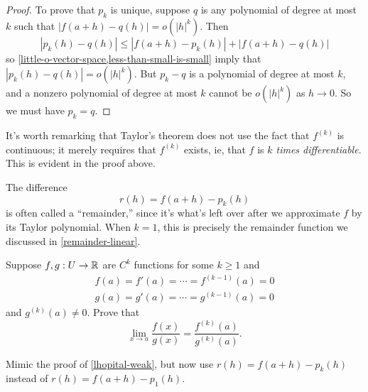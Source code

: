 \begin{proof}
	To prove that $p_k$ is unique, suppose $q$ is any polynomial of degree at most $k$ such that $|f(a+h) -q(h)| = o(|h|^k)$. Then 
	\[ |p_k(h) - q(h)| \leq |f(a+h) - p_k(h)| + |f(a+h) - q(h)| \] 
	so \cref{little-o-vector-space,less-than-small-is-small} imply that $|p_k(h) -  q(h)| = o(|h|^k)$. But $p_k - q$ is a polynomial of degree at most $k$, and a nonzero polynomial of degree at most $k$ cannot be $o(|h|^k)$ as $h \to 0$. So we must have $p_k = q$.
\end{proof}

\begin{unimportantremark}
	It's worth remarking that Taylor's theorem does not use the fact that $f^{(k)}$ is continuous; it merely requires that $f^{(k)}$ exists, ie, that $f$ is \emph{$k$ times differentiable}. This is evident in the proof above. 
\end{unimportantremark}

The difference 
\[ r(h) = f(a+h) - p_k(h) \]
is often called a ``remainder,'' since it's what's left over after we approximate $f$ by its Taylor polynomial. When $k = 1$, this is precisely the remainder function we discussed in \cref{remainder-linear}.

\begin{exercise} \label{lhopital-less-weak}
	Suppose $f, g : U \to \mathbb{R}$ are $C^k$ functions for some $k \geq 1$ and 
	\[ \begin{aligned} f(a) = f'(a) = \dotsb = f^{(k-1)}(a) = 0 \\
	g(a) = g'(a) = \dotsb = g^{(k-1)}(a) = 0 \end{aligned} \]
	and $g^{(k)}(a) \neq 0$. Prove that 
	\[ \lim_{x \to a} \frac{f(x)}{g(x)} = \frac{f^{(k)}(a)}{g^{(k)}(a)}. \]
	\begin{hint}
		Mimic the proof of \cref{lhopital-weak}, but now use $r(h) = f(a+h) - p_k(h)$ instead of $r(h) = f(a+h) - p_1(h)$. 
	\end{hint}
\end{exercise}

